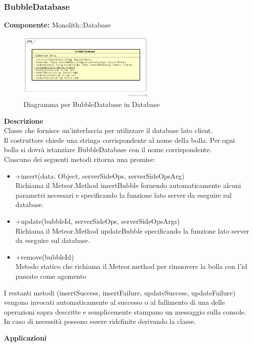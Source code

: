 \subsubsection{BubbleDatabase}
\textbf{Componente:}  Monolith::Database\\
   \FloatBarrier
   \begin{figure}[ht]
   \centering
   \includegraphics[width=0.6\textwidth]{img/single-BubbleDatabase}
   \caption{{Diagramma per BubbleDatabase in Database}}
\end{figure}
\FloatBarrier
\textbf{Descrizione}\\
Classe che fornisce un'interfaccia per utilizzare il database lato client. 
\\
Il costruttore chiede una stringa corrispondente al nome della bolla. Per ogni bolla si dovrà istanziare BubbleDatabase con il nome corrispondente.
\\
Ciascuno dei seguenti metodi ritorna una promise:
\begin{itemize} 
\item +insert(data: Object, serverSideOps, serverSideOpsArg) \\
Richiama il Meteor.Method insertBubble fornendo automaticamente alcuni parametri necessari e specificando la funzione lato server da eseguire sul database. 
\item +update(bubbleId, serverSideOps, serverSideOpsArgs) \\
Richiama il Meteor.Method updateBubble specificando la funzione lato server da eseguire sul database.
\item +remove(bubbleId) \\
Metodo statico che richiama il Meteor.method per rimuovere la bolla con l'id passato come agomento
\end{itemize}
I restanti metodi (insertSuccess, insertFailure, updateSuccess, updateFailure) vengono invocati automaticamente al successo o al fallimento di una delle operazioni sopra descritte e semplicemente stampano un messaggio sulla console. In caso di necessità possono essere ridefinite derivando la classe. 


\textbf{Applicazioni}\\
 


